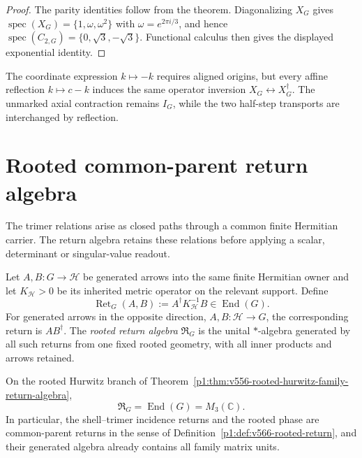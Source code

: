 \documentclass[11pt]{article}
\begin{document}
\begin{proof}
The parity identities follow from the theorem.  Diagonalizing $X_G$ gives
$\operatorname{spec}(X_G)=\{1,\omega,\omega^2\}$ with
$\omega=e^{2\pi i/3}$, and hence
$\operatorname{spec}(C_{2,G})=\{0,\sqrt3,-\sqrt3\}$.  Functional calculus
then gives the displayed exponential identity.
\end{proof}

\begin{remark}
\label{p1:rem:v563-halfstep-source-firewall}
The coordinate expression \(k\mapsto-k\) requires aligned origins,
but every affine reflection \(k\mapsto c-k\) induces the same
operator inversion \(X_G\leftrightarrow X_G^\dagger\).  The unmarked
axial contraction remains \(I_G\), while the two half-step transports
are interchanged by reflection.
\end{remark}



\section{Rooted common-parent return algebra}
\label{p1:sec:v566-rooted-return-algebra}
The trimer relations arise as closed paths through a common finite
Hermitian carrier.  The return algebra retains these relations before
applying a scalar, determinant or singular-value readout.

\begin{definition}
\label{p1:def:v566-rooted-return}
Let $A,B:G\to\mathcal H$ be generated arrows into the same finite Hermitian
owner and let $K_{\mathcal H}>0$ be its inherited metric operator on the
relevant support.  Define
\[
 \operatorname{Ret}_G(A,B):=A^\dagger K_{\mathcal H}^{-1}B
 \in\operatorname{End}(G).
\]
For generated arrows in the opposite direction, $A,B:\mathcal H\to G$, the
corresponding return is $AB^\dagger$.  The \emph{rooted return algebra}
$\mathfrak R_G$ is the unital $*$-algebra generated by all such returns from
one fixed rooted geometry, with all inner products and arrows retained.
\end{definition}

\begin{theorem}
\label{p1:thm:v566-rooted-return-full-family-algebra}
On the rooted Hurwitz branch of
Theorem~\ref{p1:thm:v556-rooted-hurwitz-family-return-algebra},
\[
 \boxed{\mathfrak R_G=\operatorname{End}(G)=M_3(\mathbb C).}
\]
In particular, the shell--trimer incidence returns and the rooted phase are
common-parent returns in the sense of
Definition~\ref{p1:def:v566-rooted-return}, and their generated algebra already
contains all family matrix units.
\end{theorem}
\end{document}
